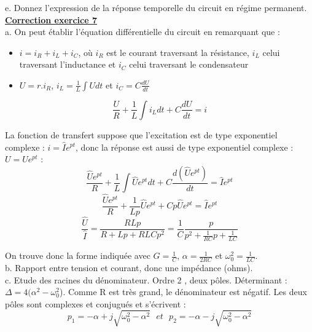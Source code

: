 \documentclass[11pt]{report}
\begin{document}
 	e. Donnez l'expression de la réponse temporelle du circuit en régime permanent.\\
 	
 	\textbf{\underline{Correction exercice 7}}\\
 	
 	a. On peut établir l'équation différentielle du circuit en remarquant que :
 	\begin{itemize}
 		\item $i=i_R+i_L+i_C$, où $i_R$ est le courant traversant la résistance, $i_L$ celui traversant l'inductance et $i_C$ celui traversant le condensateur
 		\item $U=r.i_R$, $i_L=\frac{1}{L}\int U dt$ et $i_C=C\frac{dU}{dt}$
 	\end{itemize} 
 	
 	\begin{equation*}
 	\frac{U}{R}+\frac{1}{L}\int i_L dt+C\frac{dU}{dt}=i
 	\end{equation*}
 	
 	La fonction de transfert suppose que l'excitation est de type exponentiel complexe : $i=\hat{I}e^{pt}$, donc la réponse est aussi de type exponentiel complexe : $U=\hat{U}e^{pt}$ :
 	\begin{equation*}
 	\frac{\hat{U}e^{pt}}{R}+\frac{1}{L}\int \hat{U}e^{pt} dt+C\frac{d(\hat{U}e^{pt})}{dt}=\hat{I}e^{pt}
 	\end{equation*}
 	\begin{equation*}
 	\frac{\hat{U}e^{pt}}{R}+\frac{1}{Lp}\hat{U}e^{pt}+Cp\hat{U}e^{pt}=\hat{I}e^{pt}
 	\end{equation*}
 	\begin{equation*}
 	\frac{\hat{U}}{\hat{I}}=\frac{RLp}{R+Lp+RLCp^2}=\frac{1}{C}\frac{p}{p^2+\frac{1}{RC}p+\frac{1}{LC}}
 	\end{equation*}
 	
 	On trouve donc la forme indiquée avec $G=\frac{1}{C}$, $\alpha=\frac{1}{2RC}$ et $\omega_0^2=\frac{1}{LC}$.\\
 	
 	b. Rapport entre tension et courant, donc une impédance (ohms).\\
 	
 	c. Etude des racines du dénominateur. Ordre 2 , deux pôles.
 	Déterminant : $\Delta=4(\alpha^2-\omega_{0}^2$). Comme R est très grand, le dénominateur est négatif. Les deux pôles sont complexes et conjugués et s'écrivent :
 	\begin{equation*}
 	p_1=-\alpha+j\sqrt{\omega_{0}^2-\alpha^2}~~~et~~~p_2=-\alpha-j\sqrt{\omega_{0}^2-\alpha^2}
 	\end{equation*}
 	
\end{document}
